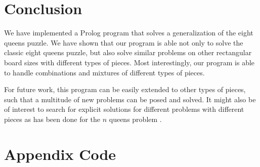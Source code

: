 \documentclass{article}
\begin{document}
\section{Conclusion} \label{sec:conclusion}

We have implemented a Prolog program that solves a generalization of the eight queens puzzle. We have shown that our program is able not only to solve the classic eight queens puzzle, but also solve similar problems on other rectangular board sizes with different types of pieces. Most interestingly, our program is able to handle combinations and mixtures of different types of pieces.

For future work, this program can be easily extended to other types of pieces, such that a multitude of new problems can be posed and solved. It might also be of interest to search for explicit solutions for different problems with different pieces as has been done for the $n$ queens problem \cite{Bernhardsson1991ExplicitST}.




\section*{Appendix Code}
\end{document}
